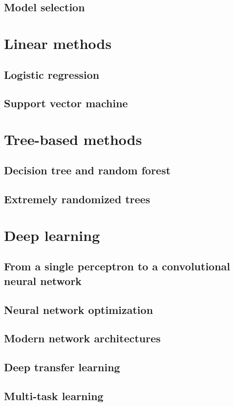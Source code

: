 \subsection{Model selection}

\section{Linear methods}

\subsection{Logistic regression}
% 

\subsection{Support vector machine}

\section{Tree-based methods}

\subsection{Decision tree and random forest}

\subsection{Extremely randomized trees}

\section{Deep learning}

\subsection{From a single perceptron to a convolutional neural network}

\subsection{Neural network optimization}

\subsection{Modern network architectures}

\subsection{Deep transfer learning}

\subsection{Multi-task learning}


